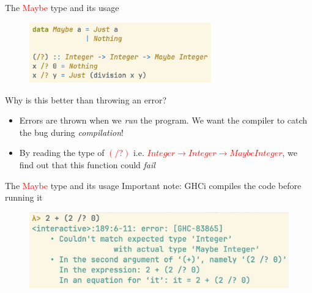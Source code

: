 \documentclass[pdf]{beamer}
\newcommand{\code}[1]{\textcolor{Red}{\textsf{#1}}}
\begin{document}
\begin{frame}{The \code{Maybe} type and its usage}
  \begin{figure}[H]
    \centering
    \includegraphics[width=0.70\textwidth]{Maybe-hs}
  \end{figure}
  Why is this better than throwing an error?
  \begin{itemize}
  \item Errors are thrown when we \textit{run} the program. We want the compiler to catch the bug during \textit{compilation}!
  \item By reading the type of \code{$(/?)$} i.e. \code{$Integer \to Integer \to Maybe Integer$}, we find out that this function could \textit{fail}
  \end{itemize}
\end{frame}

\begin{frame}{The \code{Maybe} type and its usage}
  Important note: GHCi compiles the code before running it
\begin{figure}[H]
    \centering
    \includegraphics[width=\textwidth]{safeDivision}
  \end{figure}
\end{frame}
\end{document}
